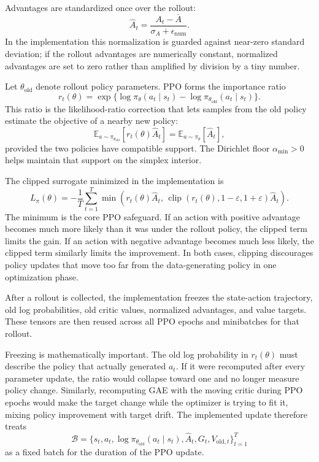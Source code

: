 \documentclass[11pt]{article}
\newcommand{\E}{\mathbb{E}}
\newcommand{\1}{\mathbf{1}}
\begin{document}
Advantages are standardized once over the rollout:
\[
\hat{A}_t = \frac{A_t-\bar{A}}{\sigma_A+\epsilon_{\mathrm{num}}}.
\]
In the implementation this normalization is guarded against near-zero standard
deviation; if the rollout advantages are numerically constant, normalized
advantages are set to zero rather than amplified by division by a tiny number.

Let $\theta_{\mathrm{old}}$ denote rollout policy parameters. PPO forms the
importance ratio
\[
r_t(\theta)=
\exp\{\log\pi_\theta(a_t\mid s_t)
-\log\pi_{\theta_{\mathrm{old}}}(a_t\mid s_t)\}.
\]
This ratio is the likelihood-ratio correction that lets samples from the old
policy estimate the objective of a nearby new policy:
\[
\E_{a\sim\pi_{\theta_{\mathrm{old}}}}
\left[
r_t(\theta)\hat{A}_t
\right]
=
\E_{a\sim\pi_{\theta}}
\left[
\hat{A}_t
\right],
\]
provided the two policies have compatible support. The Dirichlet floor
$\alpha_{\min}>0$ helps maintain that support on the simplex interior.

The clipped surrogate minimized in the implementation is
\[
L_\pi(\theta)
=-\frac{1}{T}\sum_{t=1}^{T}
\min\left(
r_t(\theta)\hat{A}_t,\,
\operatorname{clip}(r_t(\theta),1-\varepsilon,1+\varepsilon)\hat{A}_t
\right).
\]
The minimum is the core PPO safeguard. If an action with positive advantage
becomes much more likely than it was under the rollout policy, the clipped term
limits the gain. If an action with negative advantage becomes much less likely,
the clipped term similarly limits the improvement. In both cases, clipping
discourages policy updates that move too far from the data-generating policy in
one optimization phase.

After a rollout is collected, the implementation freezes the state-action
trajectory, old log probabilities, old critic values, normalized advantages,
and value targets. These tensors are then reused across all PPO epochs and
minibatches for that rollout.

Freezing is mathematically important. The old log probability in
$r_t(\theta)$ must describe the policy that actually generated $a_t$. If it
were recomputed after every parameter update, the ratio would collapse toward
one and no longer measure policy change. Similarly, recomputing GAE with the
moving critic during PPO epochs would make the target change while the optimizer
is trying to fit it, mixing policy improvement with target drift. The
implemented update therefore treats
\[
\mathcal{B}=
\{s_t,a_t,\log\pi_{\theta_{\mathrm{old}}}(a_t\mid s_t),
\hat{A}_t,G_t,V_{\mathrm{old},t}\}_{t=1}^{T}
\]
as a fixed batch for the duration of the PPO update.
\end{document}
